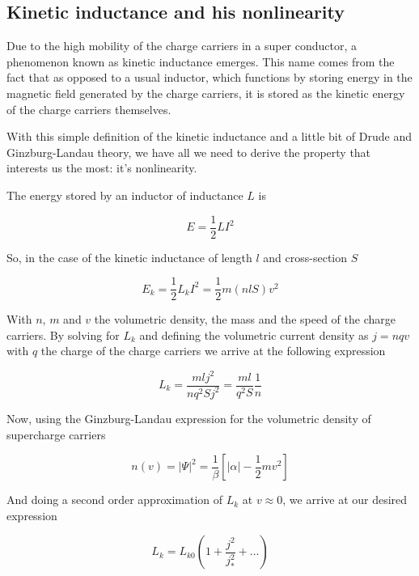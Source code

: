 \documentclass[../main.tex]{subfiles}
\begin{document}
\newpage
\subsection{Kinetic inductance and his nonlinearity}
Due to the high mobility of the charge carriers in a super conductor, a phenomenon
known as kinetic inductance emerges. This name comes from the fact that as opposed
to a usual inductor, which functions by storing energy in the magnetic field
generated by the charge carriers, it is stored as the kinetic energy of the
charge carriers themselves.

With this simple definition of the kinetic inductance and a little bit of
Drude and Ginzburg-Landau theory, we have all we need to derive the property
that interests us the most: it's nonlinearity.

The energy stored by an inductor of inductance \(L\) is

\begin{equation*}
\label{eq:InductiveEnergy}
    E = \frac{1}{2}LI^2
\end{equation*}

So, in the case of the kinetic inductance of length \(l\) and cross-section \(S\)

\begin{equation*}
\label{eq:KineticInductiveEnergy}
    E_{k} = \frac{1}{2}L_{k}I^2 = \frac{1}{2}m(nlS)v^2
\end{equation*}

With \(n\), \(m\) and \(v\) the volumetric density, the mass and the speed of
the charge carriers. By solving for \(L_{k}\) and defining the volumetric
current density as \(j=nqv\) with \(q\) the charge of the charge carriers
we arrive at the following expression

\begin{equation*}
\label{eq:LkOfn}
    L_{k} = \frac{mlj^2}{nq^2Sj^2} = \frac{ml}{q^2S}\frac{1}{n}
\end{equation*}

Now, using the Ginzburg-Landau expression for the volumetric density of supercharge
carriers

\begin{equation*}
\label{eq:GLn}
    n(v) = |\Psi|^2 = \frac{1}{\beta}\left[|\alpha| - \frac{1}{2}m v^2\right]
\end{equation*}

And doing a second order approximation of \(L_{k}\) at \(v \approx 0\), we arrive
at our desired expression

\begin{equation}
\label{eq:KineticNonLineality}
    L_{k} = L_{k0}\left(1 + \frac{j^2}{j_{*}^2} + \dots\right)
\end{equation}
\end{document}
